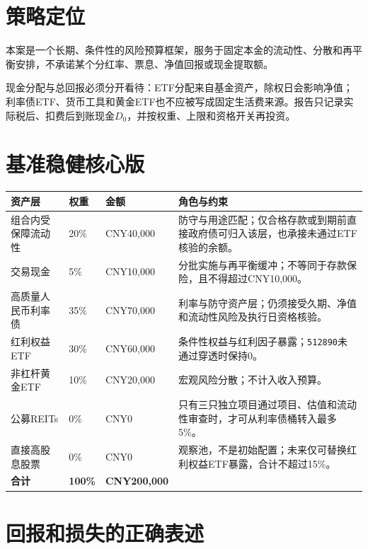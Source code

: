 \section{策略定位}

本案是一个长期、条件性的风险预算框架，服务于固定本金的流动性、分散和再平衡安排，不承诺某个分红率、票息、净值回报或现金提取额。

现金分配与总回报必须分开看待：ETF分配来自基金资产，除权日会影响净值；利率债ETF、货币工具和黄金ETF也不应被写成固定生活费来源。报告只记录实际税后、扣费后到账现金$D_0$，并按权重、上限和资格开关再投资。

\section{基准稳健核心版}

\begin{exhibitbox}
\small
\begin{tabularx}{\exhibitboxwidth}{L{3.2cm}P P P}
\toprule
\textbf{资产层} & \textbf{权重} & \textbf{金额} & \textbf{角色与约束} \\
\midrule
组合内受保障流动性 & 20\% & CNY40,000 & 防守与用途匹配；仅合格存款或到期前直接政府债可归入该层，也承接未通过ETF核验的余额。 \\
交易现金 & 5\% & CNY10,000 & 分批实施与再平衡缓冲；不等同于存款保险，且不得超过CNY10,000。 \\
高质量人民币利率债 & 35\% & CNY70,000 & 利率与防守资产层；仍须接受久期、净值和流动性风险及执行日资格核验。 \\
红利权益ETF & 30\% & CNY60,000 & 条件性权益与红利因子暴露；\texttt{512890}未通过穿透时保持0。 \\
非杠杆黄金ETF & 10\% & CNY20,000 & 宏观风险分散；不计入收入预算。 \\
公募REITs & 0\% & CNY0 & 只有三只独立项目通过项目、估值和流动性审查时，才可从利率债桶转入最多5\%。 \\
直接高股息股票 & 0\% & CNY0 & 观察池，不是初始配置；未来仅可替换红利权益ETF暴露，合计不超过15\%。 \\
\midrule
\textbf{合计} & \textbf{100\%} & \textbf{CNY200,000} & \\
\bottomrule
\end{tabularx}
\end{exhibitbox}

\section{回报和损失的正确表述}

